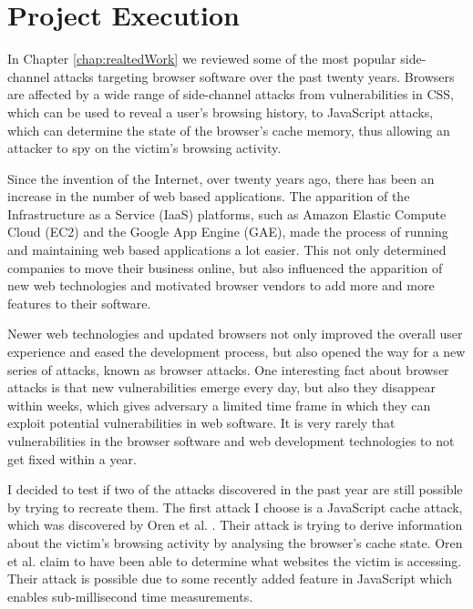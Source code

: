 \documentclass[10pt,a4paper,twoside]{book}
\begin{document}

\chapter{Project Execution}
\label{chap:execution}


In Chapter \ref{chap:realtedWork} we reviewed some of the most popular side-channel attacks targeting browser software over the past twenty years. Browsers are affected by a wide range of side-channel attacks from vulnerabilities in CSS, which can be used to reveal a user's browsing history, to JavaScript attacks, which can determine the state of the browser's cache memory, thus allowing an attacker to spy on the victim's browsing activity.

Since the invention of the Internet, over twenty years ago, there has been an increase in the number of web based applications. The apparition of the Infrastructure as a Service (IaaS) platforms, such as Amazon Elastic Compute Cloud (EC2) and the Google App Engine (GAE), made the process of running and maintaining web based applications a lot easier. This not only determined companies to move their business online, but also influenced the apparition of new web technologies and motivated browser vendors to add more and more features to their software. 

Newer web technologies and updated browsers not only improved the overall user experience and eased the development process, but also opened the way for a new series of attacks, known as browser attacks. One interesting fact about browser attacks is that new vulnerabilities emerge every day, but also they disappear within weeks, which gives adversary a limited time frame in which they can exploit potential vulnerabilities in web software. It is very rarely that vulnerabilities in the browser software and web development technologies to not get fixed within a year.

I decided to test if two of the attacks discovered in the past year are still possible by trying to recreate them. The first attack I choose is a JavaScript cache attack, which was discovered by Oren et al. \cite{oren2015spy}. Their attack is trying to derive information about the victim's browsing activity by analysing the browser's cache state. Oren et al. \cite{oren2015spy} claim to have been able to determine what websites the victim is accessing. Their attack is possible due to some recently added feature in JavaScript which enables sub-millisecond time measurements.
\end{document}
